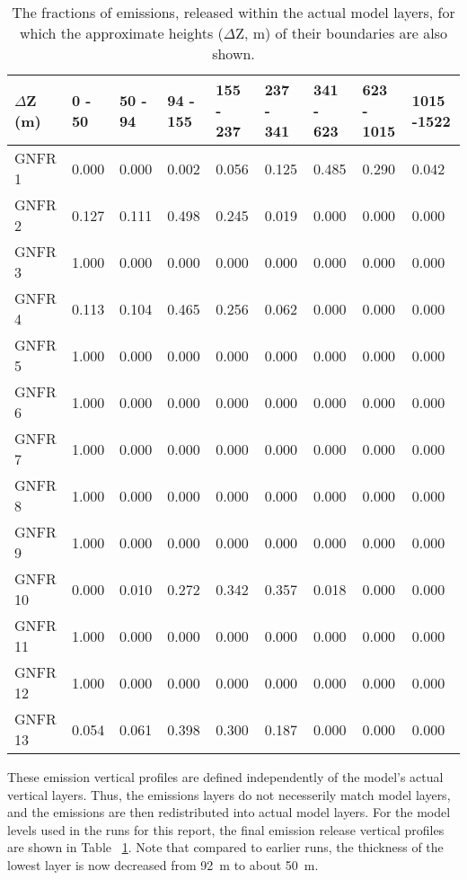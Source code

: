 \begin{table}[!hb]
\begin{center}
\caption{The fractions of emissions, released within the actual model
  layers, for which the approximate heights ($\Delta$Z, m) of their
  boundaries are also shown.
\label{tab:ModelEmisH}}
\begin{footnotesize}
\begin{tabular}{lllllllll}
\hline
$\Delta$Z (m)& 0 - 50 & 50 - 94 & 94 - 155 & 155 - 237 & 237 - 341 & 341 - 623 & 623 - 1015& 1015 -1522\\
\hline
GNFR 1 & 0.000 &0.000 &0.002 &0.056 &0.125 &0.485 &0.290 &0.042\\
GNFR 2 &0.127  &0.111 &0.498 &0.245 &0.019 &0.000 &0.000 &0.000\\
GNFR 3& 1.000  &0.000 &0.000 &0.000 &0.000 &0.000 &0.000 &0.000\\
GNFR 4& 0.113  &0.104 &0.465 &0.256 &0.062 &0.000 &0.000 &0.000\\
GNFR 5& 1.000  &0.000 &0.000 &0.000 &0.000 &0.000 &0.000 &0.000\\
GNFR 6& 1.000  &0.000 &0.000 &0.000 &0.000 &0.000 &0.000 &0.000\\
GNFR 7& 1.000  &0.000 &0.000 &0.000 &0.000 &0.000 &0.000 &0.000\\
GNFR 8& 1.000  &0.000 &0.000 &0.000 &0.000 &0.000 &0.000 &0.000\\
GNFR 9& 1.000  &0.000 &0.000 &0.000 &0.000 &0.000 &0.000 &0.000\\
GNFR 10& 0.000 &0.010 &0.272 &0.342 &0.357 &0.018 &0.000 &0.000\\
GNFR 11&1.000  &0.000 &0.000 &0.000 &0.000 &0.000 &0.000 &0.000 \\
GNFR 12& 1.000 &0.000 &0.000 &0.000 &0.000 &0.000 &0.000 &0.000\\
GNFR 13& 0.054 &0.061 &0.398 &0.300 &0.187 &0.000 &0.000 &0.000\\
\hline 
\end{tabular}
\end{footnotesize}
\end{center}
\end{table}

These emission vertical profiles are defined independently of
the model's actual vertical layers. 
Thus, the emissions layers do
not necesserily match model layers, and the emissions are then
redistributed into actual model layers.  For the model levels used in
the runs for this report, the final emission release vertical profiles
are shown in Table ~\ref{tab:ModelEmisH}. Note that compared to
earlier runs, the thickness of the lowest layer is now decreased from
92~m to about 50~m.


